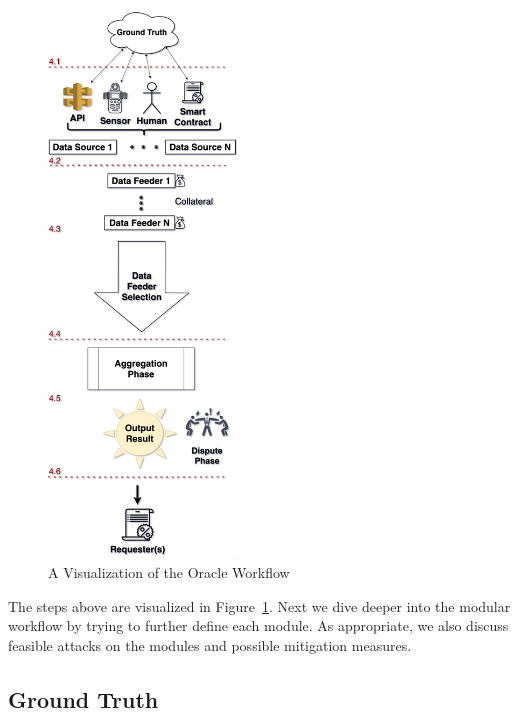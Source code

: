 \begin{figure}[t!]
    \centering
    \includegraphics[width=0.45\textwidth]{figures/data_flow_vertical.png}
    \caption{A Visualization of the Oracle Workflow}
    \label{fig:dataflow}
\end{figure}	
	
	
	
The steps above are visualized in Figure~\ref{fig:dataflow}. Next we dive deeper into the modular workflow by trying to further define each module. As appropriate, we also discuss feasible attacks on the modules and possible mitigation measures.


\subsection{Ground Truth}\label{ground_truth} 


